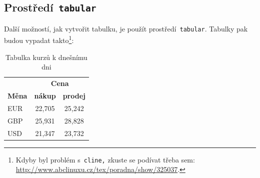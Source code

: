 \documentclass[11pt]{article}
\begin{document}
\subsection{Prostředí\texttt{ tabular}}
Další možností, jak vytvořit tabulku, je použít prostředí\texttt{ tabular}. Tabulky pak budou vypadat takto\footnote{Kdyby byl problém s\texttt{ cline,} zkuste se podívat třeba sem: \url{http://www.abclinuxu.cz/tex/poradna/show/325037}.}:
\bigskip
\begin{table}[h]
    \begin{center}
        \begin{tabular}{|l|c|c|}
            \hline
                          & \multicolumn{2}{|c|}{\textbf{Cena}}                   \\
            \cline{2-3}
            \textbf{Měna} & \textbf{nákup}                      & \textbf{prodej} \\
            \hline
            EUR           & 22,705                              & 25,242          \\
            GBP           & 25,931                              & 28,828          \\
            USD           & 21,347                              & 23,732          \\
            \hline
        \end{tabular}
        \caption{Tabulka kurzů k dnešnímu dni}
        \label{tab:rates}
    \end{center}
\end{table}
\end{document}
